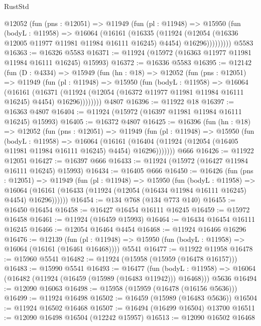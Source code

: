 \begin{lexlean}{RustStd}
\begin{coremodule}
        @12052
          (fun (pns : @12051) =>
          @11949
            (fun (pl : @11948) =>
            @15950
              (fun (bodyL : @11958) =>
              @16064
                (@16161
                  (@16335
                    (@11924
                      (@12054 (@16336 @12005 @11977 @11981 @11984 @16111 @16245) @4454)
                      @16296)))))))))
    @5583
@16363 := @16326 @5583
@16371 := @11924 (@15972 (@16363 @11977 @11981 @11984 @16111 @16245) @15993)
@16372 := @16336 @5583
@16395 := @12142
    (fun (D : @4334) =>
    @15949
      (fun (hn : @18) =>
      @12052
        (fun (pns : @12051) =>
        @11949
          (fun (pl : @11948) =>
          @15950
            (fun (bodyL : @11958) =>
            @16064
              (@16161
                (@16371
                  (@11924 (@12054 (@16372 @11977 @11981 @11984 @16111 @16245) @4454) @16296))))))))
    @4807
@16396 := @11922 @18
@16397 := @16363 @4807
@16404 := @11924 (@15972 (@16397 @11981 @11984 @16111 @16245) @15993)
@16405 := @16372 @4807
@16425 := @16396
    (fun (hn : @18) =>
    @12052
      (fun (pns : @12051) =>
      @11949
        (fun (pl : @11948) =>
        @15950
          (fun (bodyL : @11958) =>
          @16064
            (@16161
              (@16404 (@11924 (@12054 (@16405 @11981 @11984 @16111 @16245) @4454) @16296)))))))
    @666
@16426 := @11922 @12051
@16427 := @16397 @666
@16433 := @11924 (@15972 (@16427 @11984 @16111 @16245) @15993)
@16434 := @16405 @666
@16450 := @16426
    (fun (pns : @12051) =>
    @11949
      (fun (pl : @11948) =>
      @15950
        (fun (bodyL : @11958) =>
        @16064 (@16161 (@16433 (@11924 (@12054 (@16434 @11984 @16111 @16245) @4454) @16296))))))
@16454 := @134 @768 (@134 @773 @140)
@16455 := @16450 @16454
@16458 := @16427 @16454 @16111 @16245
@16459 := @15972 @16458
@16461 := @11924 (@16459 @15993)
@16464 := @16434 @16454 @16111 @16245
@16466 := @12054 @16464 @4454
@16468 := @11924 @16466 @16296
@16476 := @12139
    (fun (pl : @11948) => @15950 (fun (bodyL : @11958) => @16064 (@16161 (@16461 @16468))))
    @5541
@16477 := @11922 @11958
@16478 := @15960 @5541
@16482 := @11924 (@15958 (@15959 (@16478 @16157)))
@16483 := @15990 @5541
@16493 := @16477
    (fun (bodyL : @11958) => @16064 (@16482 (@11924 (@16459 (@15989 (@16483 @11942))) @16468)))
    @5636
@16494 := @12090 @16063
@16498 := @15958 (@15959 (@16478 (@16156 @5636)))
@16499 := @11924 @16498
@16502 := @16459 (@15989 (@16483 @5636))
@16504 := @11924 @16502 @16468
@16507 := @16494 (@16499 @16504) @13700
@16511 := @12090 @16498 @16504 (@12242 @15957)
@16513 := @12090 @16502 @16468

\end{coremodule}
\end{lexlean}

